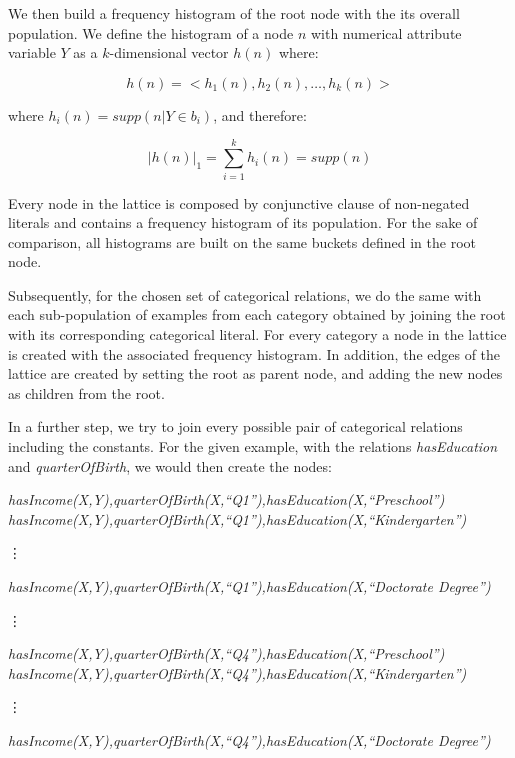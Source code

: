 We then build a frequency histogram of the root node with the its overall population. We define the histogram of a
node
$n$ with numerical attribute variable $Y$ as a $k$-dimensional vector $h(n)$ where:

\begin{equation}
 h(n)=<h_1(n),h_2(n),\ldots,h_k(n)>
\end{equation}

where $h_i(n)=supp(n|Y \in b_i)$, and therefore:

\begin{equation}
  |h(n)|_1=\sum_{i=1}^{k}h_i(n)=supp(n)
\end{equation}

Every node in the lattice is composed by conjunctive clause of non-negated literals and contains a frequency histogram
of its population. For the sake of comparison, all histograms are built on the same buckets defined in the
root node. 

Subsequently, for the chosen set of categorical relations, we do the same with each sub-population of examples from
each
category obtained by joining the root with its corresponding categorical literal. For every category a node in
the lattice is created with the associated frequency histogram. In addition, the edges of the lattice are created by
setting the root as parent node, and adding the new nodes as children from the root.

In a further step, we try to join every possible pair of categorical relations including the constants. For the
given example, with the relations \emph{hasEducation} and \emph{quarterOfBirth}, we would then create the nodes:

  \emph{hasIncome(X,Y),quarterOfBirth(X,``Q1''),hasEducation(X,``Preschool'')} \newline
  \emph{hasIncome(X,Y),quarterOfBirth(X,``Q1''),hasEducation(X,``Kindergarten'')} \newline
  \centerline{\vdots} 
  \emph{hasIncome(X,Y),quarterOfBirth(X,``Q1''),hasEducation(X,``Doctorate Degree'')} \newline

  \centerline{\vdots} 

  \emph{hasIncome(X,Y),quarterOfBirth(X,``Q4''),hasEducation(X,``Preschool'')} \newline
  \emph{hasIncome(X,Y),quarterOfBirth(X,``Q4''),hasEducation(X,``Kindergarten'')} \newline
  \centerline{\vdots} 
  \emph{hasIncome(X,Y),quarterOfBirth(X,``Q4''),hasEducation(X,``Doctorate Degree'')} \newline


